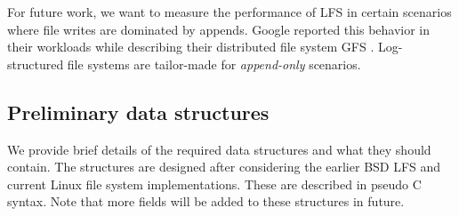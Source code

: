 \documentclass{article}
\begin{document}
For future work, we want to measure the performance of LFS in certain
scenarios where file writes are dominated by appends. Google reported this
behavior in their workloads while describing their distributed file system
GFS \cite{googlefs}. Log-structured file systems are tailor-made for 
\textit{append-only} scenarios.

\subsection{Preliminary data structures}
\label{ds}
We provide brief details of the required data structures and what they should
contain. The structures are designed after considering the earlier BSD LFS
and current Linux file system implementations. These are described 
in pseudo C syntax. Note that more fields will be added to these structures in
future.
\end{document}
